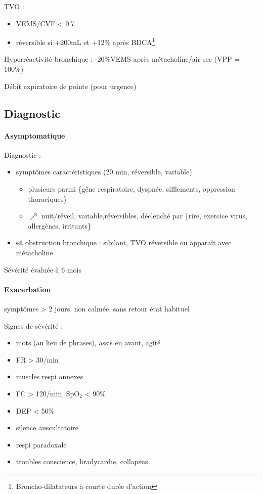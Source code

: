 \documentclass{article}
\begin{document}
TVO : 
\begin{itemize}
\item \gls{VEMS}/CVF < 0.7
\item réversible si +200mL et +12\% après BDCA\footnote{Broncho-dilatateurs à courte durée
    d'action}
\end{itemize}

Hyperréactivité bronchique : -20\%VEMS après métacholine/air sec (VPP = 100\%)

Débit expiratoire de pointe (pour urgence)

\subsection{Diagnostic}
\paragraph{Asymptomatique}
Diagnostic :
\begin{itemize}
\item symptômes caractéristiques (20 min, réversible, variable)
  \begin{itemize}
    \item plusieurs parmi \{gêne respiratoire, dyspnée,
        sifflements, oppression thoraciques\}
    \item $\nearrow$ nuit/réveil, variable,réversibles, déclenché par \{rire, exercice
      virus, allergènes, irritants\}
    \end{itemize}
\item \textbf{et} obstruction bronchique : sibilant, TVO réversible ou apparaît avec métacholine
\end{itemize}
Sévérité évaluée à 6 mois
\paragraph{Exacerbation}
\nearrow{} symptômes > 2 jours, non calmée, sans retour état habituel

Signes de sévérité :
\begin{itemize}
\item mots (au lieu de phrases), assis en avant, agité
\item FR > 30/min
\item muscles respi annexes
\item FC > 120/min, SpO\(_{\text{2}}\) < 90\%
\item DEP < 50\%
\item silence auscultatoire \skull
\item respi paradoxale \skull
\item troubles conscience, bradycardie, collapsus \skull
\end{itemize}
\end{document}
